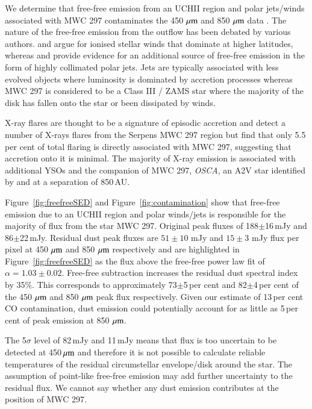 We determine that free-free emission from an UCH\textrm{II} region and polar jets/winds associated with MWC 297 contaminates the 450\,$\,\mu\rm{m}$ and 850\,$\,\mu\rm{m}$ data \citep{Skinner:1993bh}. The nature of the free-free emission from the outflow has been debated by various authors. \cite{Malbet:2007zr} and \cite{Manoj:2007ly} argue for ionised stellar winds that dominate at higher latitudes, whereas \cite{Skinner:1993bh} and \cite{Sandell:2011dz} provide evidence for an additional source of free-free emission in the form of highly collimated polar jets. Jets are typically associated with less evolved objects where luminosity is dominated by accretion processes whereas MWC 297 is considered to be a Class III / ZAMS star where the majority of the disk has fallen onto the star or been dissipated by winds. 

X-ray flares are thought to be a signature of episodic accretion and \cite{Damiani:2006ve} detect a number of X-rays flares from the Serpens MWC 297 region but find that only 5.5\,per cent of total flaring is directly associated with MWC 297, suggesting that accretion onto it is minimal. The majority of X-ray emission is associated with additional YSOs and the companion of MWC 297, \emph{OSCA}, an A2V star identified by \cite{Habart:2003fk} and \cite{Vink:2005uq} at a separation of 850\,AU. 

Figure~\ref{fig:freefreeSED} and Figure~\ref{fig:contamination} show that free-free emission due to an UCH\textrm{II} region and polar winds/jets is responsible for the majority of flux from the star MWC 297. Original peak fluxes of 188$\pm$16\,mJy and 86$\pm$22\,mJy. Residual dust peak fluxes are $51\pm10$ mJy and $15\pm3$ mJy flux per pixel at 450\,$\,\mu\rm{m}$ and 850\,$\,\mu\rm{m}$ respectively and are highlighted in Figure~\ref{fig:freefreeSED} as the flux above the free-free power law fit of $\alpha = 1.03\pm0.02$. Free-free subtraction increases the residual dust spectral index by 35\%. This corresponds to approximately 73$\pm$5\,per cent and 82$\pm$4\,per cent of the 450\,$\,\mu\rm{m}$ and 850\,$\,\mu\rm{m}$ peak flux respectively. Given our estimate of 13\,per cent CO contamination, dust emission could potentially account for as little as 5\,per cent of peak emission at 850\,$\,\mu\rm{m}$. 

The 5$\sigma$ level of 82\,mJy and 11\,mJy means that flux is too uncertain to be detected at 450$\,\mu\rm{m}$ and therefore it is not possible to calculate reliable temperatures of the residual circumstellar envelope/disk around the star. The assumption of point-like free-free emission may add further uncertainty to the residual flux. We cannot say whether any dust emission contributes at the position of MWC 297. 

